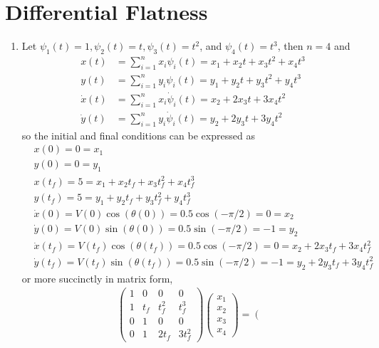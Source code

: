 \documentclass[12pt]{article}
\begin{document}
\section{Differential Flatness}
\begin{enumerate}
	\item Let $\psi_1(t) = 1, \psi_2(t) = t, \psi_3(t) = t^2$, and $\psi_4(t) = t^3$, then $n = 4$ and
	\begin{align*}
		x(t) &= \sum_{i=1}^n x_i\psi_i(t) = x_1 + x_2t + x_3t^2 + x_4t^3 \\
		y(t) &= \sum_{i=1}^n y_i\psi_i(t) = y_1 + y_2t + y_3t^2 + y_4t^3 \\
		\dot x(t) &= \sum_{i=1}^n x_i\dot \psi_i(t) = x_2 + 2x_3t + 3x_4t^2 \\
		\dot y(t) &= \sum_{i=1}^n y_i\dot \psi_i(t) = y_2 + 2y_3t + 3y_4t^2
	\end{align*}
	so the initial and final conditions can be expressed as
	\begin{align*}
		&x(0) = 0 = x_1 \\
		&y(0) = 0 = y_1 \\
		&x(t_f) = 5 = x_1 + x_2t_f + x_3t_f^2 + x_4t_f^3 \\
		&y(t_f) = 5 = y_1 + y_2t_f + y_3t_f^2 + y_4t_f^3 \\
		&\dot x(0) = V(0)\cos(\theta(0)) = 0.5\cos(-\pi/2) = 0 = x_2 \\
		&\dot y(0) = V(0)\sin(\theta(0)) = 0.5\sin(-\pi/2) = -1 = y_2 \\
		&\dot x(t_f) = V(t_f)\cos(\theta(t_f)) = 0.5\cos(-\pi/2) = 0 = x_2 + 2x_3t_f + 3x_4t_f^2 \\
		&\dot y(t_f) = V(t_f)\sin(\theta(t_f)) = 0.5\sin(-\pi/2) = -1 = y_2 + 2y_3t_f + 3y_4t_f^2
	\end{align*}
	or more succinctly in matrix form,
	\begin{align*}
		\left(\begin{array}{cccc}
		1 & 0 & 0 & 0 \\
		1 & t_f & t_f^2 & t_f^3 \\
		0 & 1 & 0 & 0 \\
		0 & 1 & 2t_f & 3t_f^2
		\end{array}\right)
		\left(\begin{array}{c}
		x_1 \\
		x_2 \\
		x_3 \\
		x_4
		\end{array}\right) =
		\left(\begin{array}{cccc}

\end{array}
\end{align*}
\end{enumerate}
\end{document}
